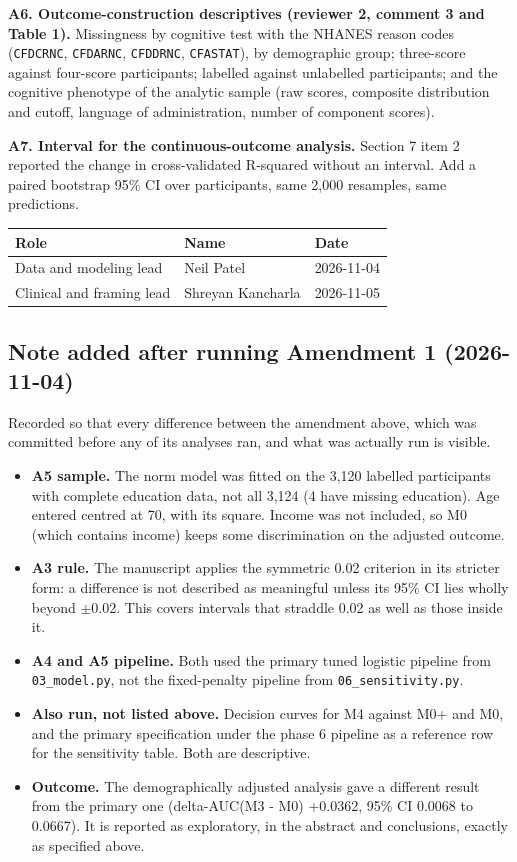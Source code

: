 \documentclass[11pt]{article}
\begin{document}
\textbf{A6. Outcome-construction descriptives (reviewer 2, comment 3 and Table 1).} Missingness by cognitive test with the NHANES reason codes (\texttt{CFDCRNC}, \texttt{CFDARNC}, \texttt{CFDDRNC}, \texttt{CFASTAT}), by demographic group; three-score against four-score participants; labelled against unlabelled participants; and the cognitive phenotype of the analytic sample (raw scores, composite distribution and cutoff, language of administration, number of component scores).

\textbf{A7. Interval for the continuous-outcome analysis.} Section 7 item 2 reported the change in cross-validated R-squared without an interval. Add a paired bootstrap 95\% CI over participants, same 2,000 resamples, same predictions.

\begin{longtable}{L{5.5cm}L{4cm}L{4cm}}
\toprule
Role & Name & Date \\
\midrule
Data and modeling lead & Neil Patel & 2026-11-04 \\
Clinical and framing lead & Shreyan Kancharla & 2026-11-05 \\
\bottomrule
\end{longtable}
\subsection*{Note added after running Amendment 1 (2026-11-04)}
Recorded so that every difference between the amendment above, which was committed before any of its analyses ran, and what was actually run is visible.

\begin{itemize}[leftmargin=1.2cm]
\item \textbf{A5 sample.} The norm model was fitted on the 3,120 labelled participants with complete education data, not all 3,124 (4 have missing education). Age entered centred at 70, with its square. Income was not included, so M0 (which contains income) keeps some discrimination on the adjusted outcome.
\item \textbf{A3 rule.} The manuscript applies the symmetric 0.02 criterion in its stricter form: a difference is not described as meaningful unless its 95\% CI lies wholly beyond $\pm$0.02. This covers intervals that straddle 0.02 as well as those inside it.
\item \textbf{A4 and A5 pipeline.} Both used the primary tuned logistic pipeline from \texttt{03\_model.py}, not the fixed-penalty pipeline from \texttt{06\_sensitivity.py}.
\item \textbf{Also run, not listed above.} Decision curves for M4 against M0+ and M0, and the primary specification under the phase 6 pipeline as a reference row for the sensitivity table. Both are descriptive.
\item \textbf{Outcome.} The demographically adjusted analysis gave a different result from the primary one (delta-AUC(M3 - M0) +0.0362, 95\% CI 0.0068 to 0.0667). It is reported as exploratory, in the abstract and conclusions, exactly as specified above.
\end{itemize}
\end{document}

